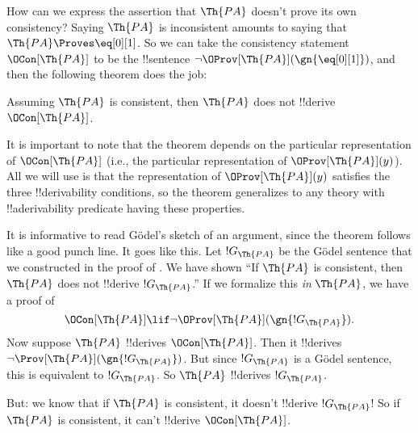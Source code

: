 \documentclass[../../../include/open-logic-section]{subfiles}
\begin{document}

How can we express the assertion that $\Th{PA}$ doesn't prove its own
consistency? Saying $\Th{PA}$ is inconsistent amounts to saying that
$\Th{PA} \Proves \eq[0][1]$. So we can take the consistency statement
$\OCon[\Th{PA}]$ to be the !!{sentence} $\lnot
\OProv[\Th{PA}](\gn{\eq[0][1]})$, and then the following theorem does
the job:

\begin{thm}
Assuming $\Th{PA}$ is consistent, then $\Th{PA}$ does not !!{derive}
$\OCon[\Th{PA}]$.
\end{thm}

It is important to note that the theorem depends on the particular
representation of $\OCon[\Th{PA}]$ (i.e., the particular
representation of $\OProv[\Th{PA}](y)$). All we will use is that the
representation of $\OProv[\Th{PA}](y)$ satisfies the three
!!{derivability} conditions, so the theorem generalizes to any theory
with !!a{derivability} predicate having these properties.

It is informative to read G\"odel's sketch of an argument, since the
theorem follows like a good punch line. It goes like this. Let
$!G_\Th{PA}$ be the G\"odel sentence that we constructed in the proof
of . We have shown ``If $\Th{PA}$
is consistent, then $\Th{PA}$ does not !!{derive} $!G_\Th{PA}$.'' If we
formalize this \emph{in} $\Th{PA}$, we have a proof of
\[
\OCon[\Th{PA}] \lif \lnot \OProv[\Th{PA}](\gn{!G_\Th{PA}}).
\]
Now suppose $\Th{PA}$ !!{derive}s $\OCon[\Th{PA}]$. Then it !!{derive}s $\lnot
\Prov[\Th{PA}](\gn{!G_\Th{PA}})$. But since $!G_\Th{PA}$ is a G\"odel
sentence, this is equivalent to $!G_\Th{PA}$. So $\Th{PA}$ !!{derive}s
$!G_\Th{PA}$.

But: we know that if $\Th{PA}$ is consistent, it doesn't !!{derive}
$!G_\Th{PA}$!{}  So if $\Th{PA}$ is consistent, it can't !!{derive}
$\OCon[\Th{PA}]$.
\end{document}
